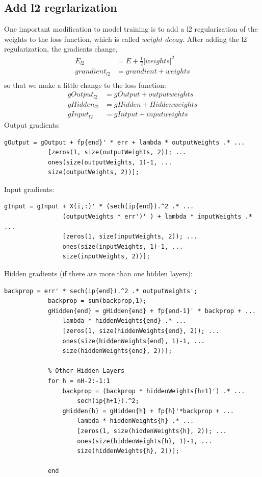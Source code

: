 \documentclass[12pt]{article}
\begin{document}
\subsection{Add l2 regrlarization}
One important modification to model training is to add a l2 regularization of the weights to the loss function, which is called $weight$ $decay$. After adding the l2 regularization, the gradients change,
\begin{align*}
E_{l2} &= E + \frac{1}{2}|weights|^2\\
grandient_{l2} &= grandient + weights\\
\end{align*}
so that we make a little change to the loss function:
\begin{align*}
gOutput_{l2} &= gOutput +outputweights\\
gHidden_{l2} &= gHidden +Hiddenweights\\
gInput_{l2} &= gIntput +inputweights
\end{align*}
Output gradients:
\begin{lstlisting}
gOutput = gOutput + fp{end}' * err + lambda * outputWeights .* ...
            [zeros(1, size(outputWeights, 2)); ...
            ones(size(outputWeights, 1)-1, ...
            size(outputWeights, 2))];
\end{lstlisting}
Input gradients:
\begin{lstlisting}
gInput = gInput + X(i,:)' * (sech(ip{end}).^2 .* ...
                (outputWeights * err')' ) + lambda * inputWeights .* ...
                [zeros(1, size(inputWeights, 2)); ...
                ones(size(inputWeights, 1)-1, ...
                size(inputWeights, 2))];  
\end{lstlisting}
Hidden gradients (if there are more than one hidden layers):
\begin{lstlisting}
backprop = err' * sech(ip{end}).^2 .* outputWeights';
            backprop = sum(backprop,1);
            gHidden{end} = gHidden{end} + fp{end-1}' * backprop + ...
                lambda * hiddenWeights{end} .* ...
                [zeros(1, size(hiddenWeights{end}, 2)); ...
                ones(size(hiddenWeights{end}, 1)-1, ...
                size(hiddenWeights{end}, 2))];
            
            % Other Hidden Layers
            for h = nH-2:-1:1
                backprop = (backprop * hiddenWeights{h+1}') .* ...
                    sech(ip{h+1}).^2;
                gHidden{h} = gHidden{h} + fp{h}'*backprop + ...
                    lambda * hiddenWeights{h} .* ...
                    [zeros(1, size(hiddenWeights{h}, 2)); ...
                    ones(size(hiddenWeights{h}, 1)-1, ...
                    size(hiddenWeights{h}, 2))];
                
            end
\end{lstlisting}
\end{document}
